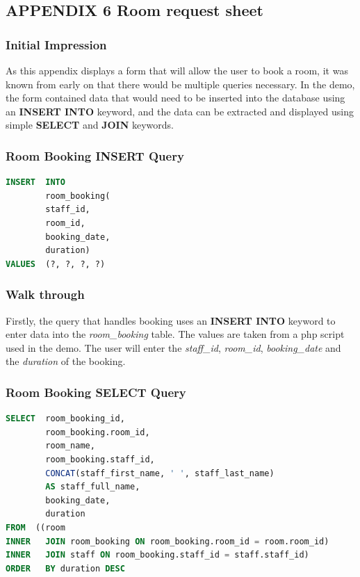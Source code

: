 \documentclass{article}
\begin{document}
\subsection{APPENDIX 6 Room request sheet}
\subsubsection{Initial Impression} As this appendix displays a form that will allow the user to book a room, it was known from early on that there would be multiple queries necessary. In the demo, the form contained data that would need to be inserted into the database using an \textbf{INSERT INTO} keyword, and the data can be extracted and displayed using simple \textbf{SELECT} and \textbf{JOIN} keywords.

\subsubsection{Room Booking INSERT Query}
\begin{lstlisting}[language=sql, caption=Room Booking Insert, style=mystyle]
INSERT  INTO 
        room_booking(
        staff_id, 
        room_id, 
        booking_date, 
        duration)
VALUES  (?, ?, ?, ?)
\end{lstlisting}

\subsubsection{Walk through} Firstly, the query that handles booking uses an \textbf{INSERT INTO} keyword to enter data into the \textit{room\_booking} table. The values are taken from a \acrshort{php} script used in the demo. The user will enter the \textit{staff\_id}, \textit{room\_id}, \textit{booking\_date} and the \textit{duration} of the booking.

\subsubsection{Room Booking SELECT Query}
\begin{lstlisting}[language=sql, caption=Room Booking Sheet, style=mystyle]
SELECT  room_booking_id, 
        room_booking.room_id, 
        room_name, 
        room_booking.staff_id, 
        CONCAT(staff_first_name, ' ', staff_last_name) 
        AS staff_full_name, 
        booking_date, 
        duration 
FROM  ((room
INNER   JOIN room_booking ON room_booking.room_id = room.room_id)
INNER   JOIN staff ON room_booking.staff_id = staff.staff_id)
ORDER   BY duration DESC
\end{lstlisting}
\end{document}
